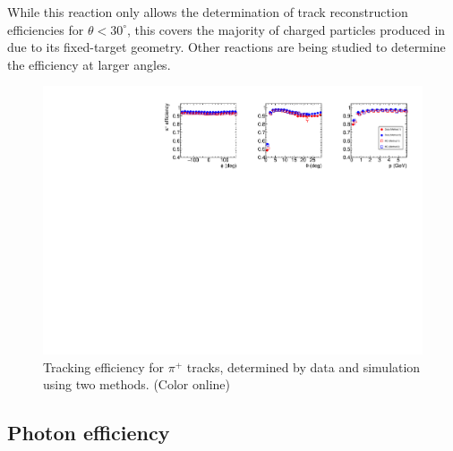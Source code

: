 While this reaction only allows the determination of track reconstruction efficiencies for $\theta < 30^\circ$, this covers the majority of charged particles produced in \gx{} due to its fixed-target geometry.  Other reactions are being studied to determine the efficiency at larger angles.


\begin{figure}[tbp]
\begin{center}
\includegraphics[width=\textwidth]{figures/PiPlusEfficiency.pdf} 
\caption{\label{fig:tracking efficiency}
Tracking efficiency for $\pi^+$ tracks, determined by data and simulation using two methods. (Color online)}
\end{center}
\end{figure}



\subsection{Photon efficiency\label{sec:perfneutral}}




